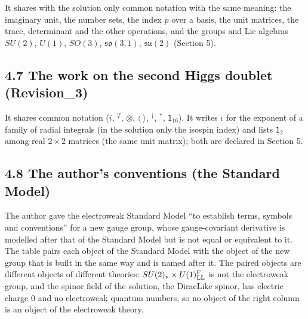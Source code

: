 \documentclass[
  10pt,
]{article}
\begin{document}
It shares with the solution only common notation with the same meaning:
the imaginary unit, the number sets, the index \(p\) over a basis, the
unit matrices, the trace, determinant and the other operations, and the
groups and Lie algebras \(SU(2)\), \(U(1)\), \(SO(3)\),
\(\mathfrak{so}(3,1)\), \(\mathfrak{su}(2)\) (Section 5).

\hypertarget{the-work-on-the-second-higgs-doublet-revision_3}{%
\subsection{4.7 The work on the second Higgs doublet
(Revision\_3)}\label{the-work-on-the-second-higgs-doublet-revision_3}}

It shares common notation (\(i\), \({}^T\), \(\otimes\),
\(\langle\ \rangle\), \({}^\dagger\), \({}^*\), \(\mathsf 1_{16}\)). It
writes \(\iota\) for the exponent of a family of radial integrals (in
the solution only the isospin index) and lists \(\mathsf 1_2\) among
real \(2\times2\) matrices (the same unit matrix); both are declared in
Section 5.

\hypertarget{the-authors-conventions-the-standard-model}{%
\subsection{4.8 The author's conventions (the Standard
Model)}\label{the-authors-conventions-the-standard-model}}

The author gave the electroweak Standard Model ``to establish terms,
symbols and conventions'' for a new gauge group, whose gauge-covariant
derivative is modelled after that of the Standard Model but is not equal
or equivalent to it. The table pairs each object of the Standard Model
with the object of the new group that is built in the same way and is
named after it. The paired objects are different objects of different
theories: \(SU(2)_{\rm v}\times U(1)^{\rm F}_{\rm LL}\) is not the
electroweak group, and the spinor field of the solution, the DiracLike
spinor, has electric charge 0 and no electroweak quantum numbers, so no
object of the right column is an object of the electroweak theory.
\end{document}
